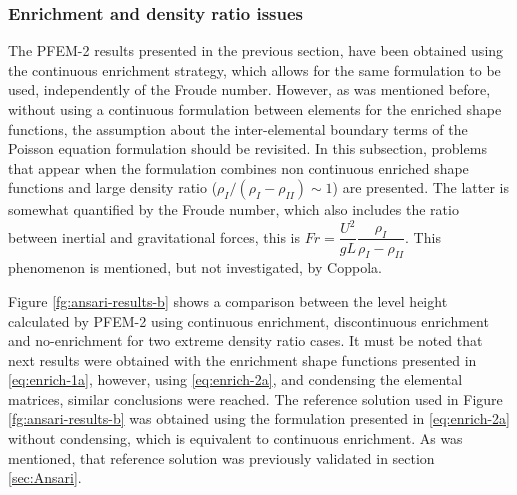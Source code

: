 \subsubsection{Enrichment and density ratio issues}

The PFEM-2 results presented in the previous section, have been obtained using the continuous enrichment strategy, which allows for the same formulation to be used, independently of the Froude number. However, as was mentioned before, without using a continuous formulation between elements for the enriched shape functions, the assumption about the inter-elemental boundary terms of the Poisson equation formulation should be revisited. In this subsection, problems that appear when the formulation combines non continuous enriched shape functions and large density ratio ($\rho_I/(\rho_I-\rho_{II})\sim 1$) are presented. The latter is somewhat quantified by the Froude number, which also includes the ratio between inertial and gravitational forces, this is $Fr = \dfrac{U^2}{gL}\dfrac{\rho_I}{\rho_I-\rho_{II}}$. This phenomenon is mentioned, but not investigated, by Coppola\cite{Coppola05}.

Figure \ref{fg:ansari-results-b} shows a comparison between the level height calculated by PFEM-2 using continuous enrichment, discontinuous enrichment and no-enrichment for two extreme density ratio cases. It must be noted that next results were obtained with the enrichment shape functions presented in \ref{eq:enrich-1a}, however, using \ref{eq:enrich-2a}, and condensing the elemental matrices, similar conclusions were reached. The reference solution used in Figure \ref{fg:ansari-results-b} was obtained using the formulation presented in \ref{eq:enrich-2a} without condensing, which is equivalent to continuous enrichment. As was mentioned, that reference solution was previously validated in section \ref{sec:Ansari}.


